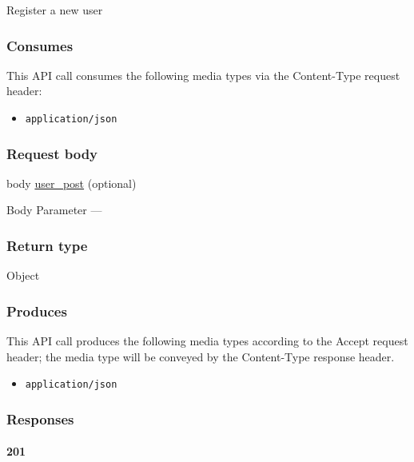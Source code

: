 Register a new user

\hypertarget{consumes-47}{%
\subsubsection{Consumes}\label{consumes-47}}

This API call consumes the following media types via the {Content-Type}
request header:

\begin{itemize}
\tightlist
\item
  \texttt{application/json}
\end{itemize}

\hypertarget{request-body-47}{%
\subsubsection{Request body}\label{request-body-47}}

body \protect\hyperlink{user_post}{user\_post} (optional)

{Body Parameter} ---

\hypertarget{return-type-114}{%
\subsubsection{Return type}\label{return-type-114}}

Object

\hypertarget{produces-145}{%
\subsubsection{Produces}\label{produces-145}}

This API call produces the following media types according to the
{Accept} request header; the media type will be conveyed by the
{Content-Type} response header.

\begin{itemize}
\tightlist
\item
  \texttt{application/json}
\end{itemize}

\hypertarget{responses-150}{%
\subsubsection{Responses}\label{responses-150}}

\hypertarget{section-482}{%
\paragraph{201}\label{section-482}}

